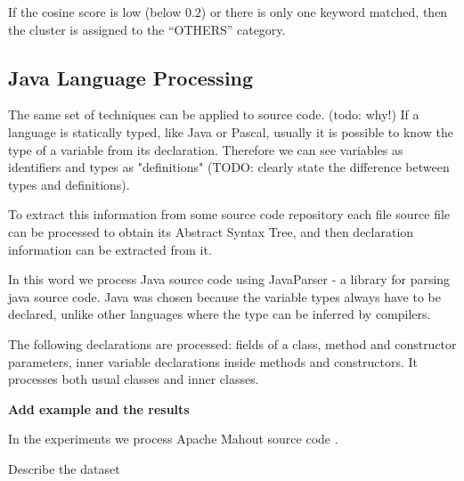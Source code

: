 If the cosine score is low (below $0.2$) or there is only one 
keyword matched, then the cluster is assigned to the ``OTHERS'' 
category.


\subsection{Java Language Processing} \label{sec:jlp}

The same set of techniques can be applied to source code.
(todo: why!)
If a language 
is statically typed, like Java or Pascal, usually it is possible to know the
type of a variable from its declaration. Therefore we can see 
variables as identifiers and types as "definitions" (TODO: clearly state 
the difference between types and definitions).

To extract this information from some source code repository each file source
file can be processed to obtain its Abstract Syntax Tree, and then 
declaration information can be extracted from it. 


In this word we process Java source code using JavaParser \cite{javaparser} - 
a library for parsing java source code. Java was chosen because the variable 
types always have to be declared, unlike other languages where the type 
can be inferred by compilers. 

The following declarations are processed: fields of a class, method and 
constructor parameters, inner variable declarations inside 
methods and constructors. It processes both usual classes and inner classes. 

\textbf{Add example and the results}


In the experiments we process Apache Mahout source code \cite{mahout}. 

Describe the dataset
